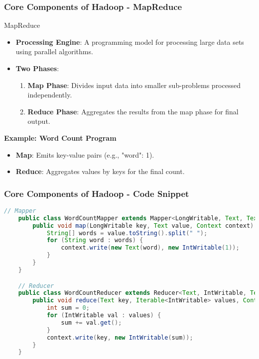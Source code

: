\documentclass[aspectratio=169]{beamer}
\begin{document}
\begin{frame}[fragile]
    \frametitle{Core Components of Hadoop - MapReduce}
    \begin{block}{MapReduce}
        \begin{itemize}
            \item \textbf{Processing Engine}: A programming model for processing large data sets using parallel algorithms.
            \item \textbf{Two Phases}:
            \begin{enumerate}
                \item \textbf{Map Phase}: Divides input data into smaller sub-problems processed independently.
                \item \textbf{Reduce Phase}: Aggregates the results from the map phase for final output.
            \end{enumerate}
        \end{itemize}
    \end{block}
    \pause
    \textbf{Example: Word Count Program}
    \begin{itemize}
        \item \textbf{Map}: Emits key-value pairs (e.g., "word": 1).
        \item \textbf{Reduce}: Aggregates values by keys for the final count.
    \end{itemize}
\end{frame}

\begin{frame}[fragile]
    \frametitle{Core Components of Hadoop - Code Snippet}
    \begin{lstlisting}[language=java, basicstyle=\small]
    // Mapper
    public class WordCountMapper extends Mapper<LongWritable, Text, Text, IntWritable> {
        public void map(LongWritable key, Text value, Context context) {
            String[] words = value.toString().split(" ");
            for (String word : words) {
                context.write(new Text(word), new IntWritable(1));
            }
        }
    }

    // Reducer
    public class WordCountReducer extends Reducer<Text, IntWritable, Text, IntWritable> {
        public void reduce(Text key, Iterable<IntWritable> values, Context context) {
            int sum = 0;
            for (IntWritable val : values) {
                sum += val.get();
            }
            context.write(key, new IntWritable(sum));
        }
    }
    \end{lstlisting}
\end{frame}
\end{document}
